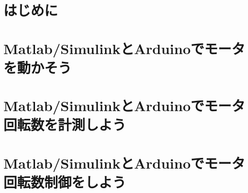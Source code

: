 \documentclass[a4paper,11pt,oneside,openany]{jsbook}
\begin{document}
\setlength{\parskip}{1.5ex plus 0ex minus 0.2ex}

\chapter{はじめに}
\thispagestyle{fancy}


\chapter{Matlab/SimulinkとArduinoでモータを動かそう}
\thispagestyle{fancy}


\chapter{Matlab/SimulinkとArduinoでモータ回転数を計測しよう}
\thispagestyle{fancy}


\chapter{Matlab/SimulinkとArduinoでモータ回転数制御をしよう}
\thispagestyle{fancy}

\end{document}
